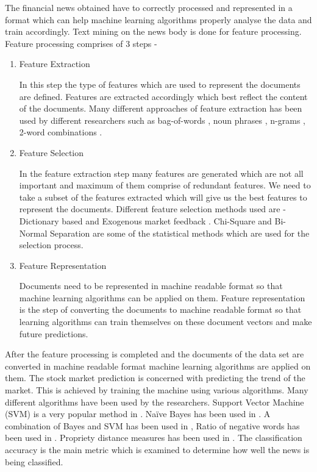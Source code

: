 \documentclass[a4paper,12bp]{report}
\begin{document}
The financial news obtained have to correctly processed and represented in a format which can help machine learning algorithms properly analyse the data and train accordingly. Text mining on the news body is done for feature processing. Feature processing comprises of 3 steps -
\begin{enumerate}
\item Feature Extraction

In this step the type of features which are used to represent the documents are defined. Features are extracted accordingly which best reflect the content of the documents. Many different approaches of feature extraction has been used by different researchers such as bag-of-words \cite{conf/wirtschaftsinformatik/GrothM09}\cite{1265201}\cite{725072}\cite{JOAR:JOAR382}\cite{antweiler2004all}, noun phrases \cite{Schumaker:2009}, n-grams \cite{butler:2009}, 2-word combinations \cite{Hagenau:2013}. 

\newpage
\item Feature Selection

In the feature extraction step many features are generated which are not all important and maximum of them comprise of redundant features. We need to take a subset of the features extracted which will give us the best features to represent the documents. Different feature selection methods used are - Dictionary based \cite{JOFI:JOFI1362} and Exogenous market feedback \cite{groth2011intraday}\cite{Hagenau:2013}. Chi-Square and Bi-Normal Separation are some of the statistical methods which are used for the selection process.

\item Feature Representation

Documents need to be represented in machine readable format so that machine learning algorithms can be applied on them. Feature representation is the step of converting the documents to machine readable format so that learning algorithms can train themselves on these document vectors and make future predictions. 
\end{enumerate}
After the feature processing is completed and the documents of the data set are converted in machine readable format machine learning algorithms are applied on them. The stock market prediction is concerned with predicting the trend of the market. This is achieved by training the machine using various algorithms. Many different algorithms have been used by the researchers. Support Vector Machine (SVM) is a very popular method in \cite{Schumaker:2009}\cite{conf/wirtschaftsinformatik/GrothM09}\cite{1265201}. Na\"{i}ve Bayes has been used in \cite{725072}. A combination of Bayes and SVM has been used in \cite{antweiler2004all}, Ratio of negative words has been used in \cite{JOFI:JOFI1362}. Propriety distance measures has been used in \cite{butler:2009}. The classification accuracy is the main metric which is examined to determine how well the news is being classified. 
\end{document}
